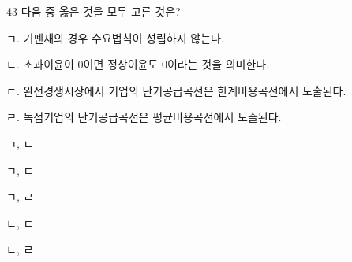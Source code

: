 \begin{question}{43}
다음 중 옳은 것을 모두 고른 것은?
\begin{framedtext}
ㄱ. 기펜재의 경우 수요법칙이 성립하지 않는다. \par
ㄴ. 초과이윤이 0이면 정상이윤도 0이라는 것을 의미한다. \par
ㄷ. 완전경쟁시장에서 기업의 단기공급곡선은 한계비용곡선에서 도출된다. \par
ㄹ. 독점기업의 단기공급곡선은 평균비용곡선에서 도출된다.
\end{framedtext}
\begin{choices}
  \item ㄱ, ㄴ
  \item ㄱ, ㄷ
  \item ㄱ, ㄹ
  \item ㄴ, ㄷ
  \item ㄴ, ㄹ
\end{choices}
\end{question}
